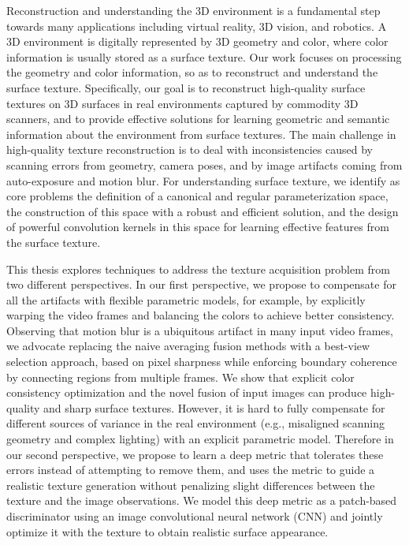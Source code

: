 Reconstruction and understanding the 3D environment is a fundamental step towards many applications including virtual reality, 3D vision, and robotics.
%
A 3D environment is digitally represented by 3D geometry and color, where color information is usually stored as a surface texture. Our work focuses on processing the geometry and color information, so as to reconstruct and understand the surface texture.
%
Specifically, our goal is to reconstruct high-quality surface textures on 3D surfaces in real environments captured by commodity 3D scanners, and to provide effective solutions for learning geometric and semantic information about the environment from surface textures.
%
The main challenge in high-quality texture reconstruction is to deal with inconsistencies caused by scanning errors from geometry, camera poses, and by image artifacts coming from auto-exposure and motion blur.
%
%
For understanding surface texture, we identify as core problems the definition of a canonical and regular parameterization space, the construction of this space with a robust and efficient solution, and the design of powerful convolution kernels in this space for learning effective features from the surface texture.

This thesis explores techniques to address the texture acquisition problem from two different perspectives.
%
In our first perspective, we propose to compensate for all the artifacts with flexible parametric models, for example, by explicitly warping the video frames and balancing the colors to achieve better consistency.
%
Observing that motion blur is a ubiquitous artifact in many input video frames, we advocate replacing the naive averaging fusion methods with a best-view selection approach, based on pixel sharpness while enforcing boundary coherence by connecting regions from multiple frames. We show that explicit color consistency optimization and the novel fusion of input images can produce high-quality and sharp surface textures.
%
However, it is hard to fully compensate for different sources of variance in the real environment (e.g., misaligned scanning geometry and complex lighting) with an explicit parametric model.
%
Therefore in our second perspective, we propose to learn a deep metric that tolerates these errors instead of attempting to remove them, and uses the metric to guide a realistic texture generation without penalizing slight differences between the texture and the image observations. We model this deep metric as a patch-based discriminator using an image convolutional neural network (CNN) and jointly optimize it with the texture to obtain realistic surface appearance.

